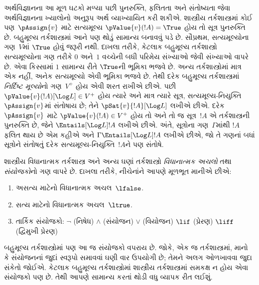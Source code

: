 અર્થવિજ્ઞાનના આ મૂળ ઘટકો મળ્યા પછી પુનરુક્તિ,
ફલિતતા અને સંતોષ્યતા જેવા અર્થવિજ્ઞાનના ખ્યાલોનો
અનુરૂપ અર્થ વ્યાખ્યાયિત કરી શકીએ. શાસ્ત્રીય
તર્કશાસ્ત્રમાં કોઈ પણ~$\pAssign{v}$ માટે સત્યમૂલ્ય
$\pValue{v}(!A) = \True$ હોય તો સૂત્ર
પુનરુક્તિ છે. બહુમૂલ્ય તર્કશાસ્ત્રમાં આને પણ થોડું
સામાન્ય બનાવવું પડે છે. સૌપ્રથમ, સત્યમૂલ્યોના
ગણ~$V$માં $\True$ હોવું જરૂરી નથી. દાખલા તરીકે,
કેટલાક બહુમૂલ્ય તર્કશાસ્ત્રો સત્યમૂલ્યોના ગણ તરીકે
$0$ અને~$1$ વચ્ચેની બધી પરિમેય સંખ્યાઓ જેવી
સંખ્યાઓ વાપરે છે. એવા કિસ્સામાં $1$ સામાન્ય રીતે
$\True$ની ભૂમિકા ભજવે છે. અન્ય તર્કશાસ્ત્રોમાં
માત્ર એક નહીં, અનેક સત્યમૂલ્યો એવી ભૂમિકા
ભજવે છે. તેથી દરેક બહુમૂલ્ય તર્કશાસ્ત્રમાં
\emph{નિર્દિષ્ટ મૂલ્યો}નો ગણ~$V^+$ હોય એવી શરત
રાખીએ છીએ. પછી $\pValue{v}(!A)[\Log L] \in V^+$
હોય ત્યારે અને માત્ર ત્યારે સૂત્ર,
સત્યમૂલ્ય-નિયુક્તિ~$\pAssign{v}$માં સંતોષાય છે;
તેને $\pSat{v}{!A}[\Log L]$ લખીએ છીએ.
દરેક~$\pAssign{v}$ માટે $\pValue{v}(!A) \in
V^+$ હોય તો અને તો જ સૂત્ર~$!A$ એ
તર્કશાસ્ત્રની પુનરુક્તિ છે, જેને $\Entails[\Log L]
!A$ લખીએ છીએ. અંતે, સૂત્રોના ગણ~$\Gamma$માંથી
$!A$ ફલિત થાય છે એમ કહીએ અને $\Gamma
\Entails[\Log L] !A$ લખીએ છીએ, જો
તે ગણનાં બધાં સૂત્રોને સંતોષતું દરેક
સત્યમૂલ્ય-નિયુક્તિ~$!A$ને પણ સંતોષે.
\endgroup


\begingroup
\makeatletter{}\makeatother


\label{guunit:OLP-0386}


શાસ્ત્રીય વિધાનાત્મક તર્કશાસ્ત્ર અને અન્ય ઘણાં
તર્કશાસ્ત્રો \emph{વિધાનાત્મક અચલો} તથા
\emph{સંયોજકો}નો ગણ વાપરે છે. દાખલા તરીકે,
નીચેનાંને આપણે મૂળભૂત માનીએ છીએ:
\begin{enumerate}
\item અસત્ય માટેનો વિધાનાત્મક અચલ~$\lfalse$.
\item સત્ય માટેનો વિધાનાત્મક અચલ~$\ltrue$.
\item તાર્કિક સંયોજકો:
  \startycommalist
  \ycomma $\lnot$ (નિષેધ)%
  \ycomma $\land$ (સંયોજન)%
  \ycomma $\lor$ (વિયોજન)%
  \ycomma $\lif$ (પ્રેરણ)%
  \ycomma $\liff$ (દ્વિમુખી પ્રેરણ)%
\end{enumerate}


બહુમૂલ્ય તર્કશાસ્ત્રોમાં પણ આ જ સંયોજકો વપરાય છે.
જોકે, એક જ તર્કશાસ્ત્રમાં, માનો કે સંયોજનનાં જુદાં
સ્વરૂપો સમાવવાં ઘણી વાર ઉપયોગી છે; તેમને અલગ
ઓળખાવવા જુદા સંકેતો જોઈએ. કેટલાક બહુમૂલ્ય
તર્કશાસ્ત્રોમાં શાસ્ત્રીય તર્કશાસ્ત્રમાં સમકક્ષ ન હોય
એવા સંયોજકો પણ છે. તેથી આપણે સામાન્ય કરતાં
થોડી વધુ વ્યાપક રીત લઈશું.

